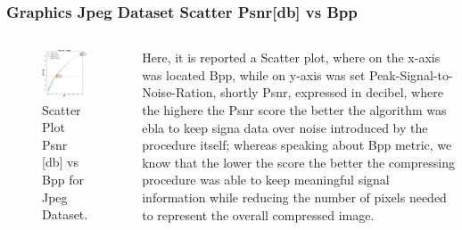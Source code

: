 




\begin{frame}
\frametitle{Graphics Jpeg Dataset Scatter Psnr[db] vs Bpp}

\begin{columns}
\begin{figure}
\includegraphics[scale=0.35]{slides/experiments/jpeg_dataset/jpeg_bpp_vs_psnr_scatter_gby_param_class.png}
\caption{Scatter Plot Psnr [db] vs Bpp for Jpeg Dataset.}
\end{figure}
Here, it is reported a Scatter plot, where on the x-axis was located Bpp, while on y-axis was set Peak-Signal-to-Noise-Ration, shortly Psnr, expressed in decibel, where the highere
the Psnr score the better the algorithm was ebla to keep signa data over noise introduced by the procedure itself; whereas speaking about Bpp metric, we know that the lower the score
the better the compressing procedure was able to keep meaningful signal information while reducing the number of pixels needed to represent the overall compressed image.
\end{columns}

\end{frame}